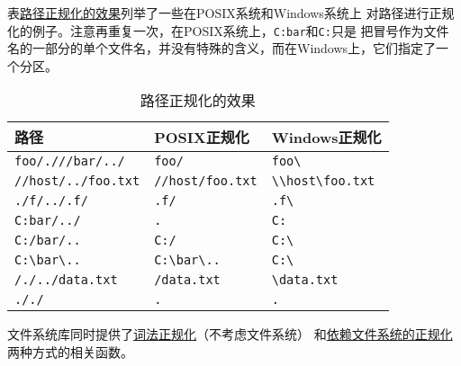 表\hyperref[t20.1]{路径正规化的效果}列举了一些在POSIX系统和Windows系统上
对路径进行正规化的例子。注意再重复一次，在POSIX系统上，\texttt{C:bar}和\texttt{C:}只是
把冒号作为文件名的一部分的单个文件名，并没有特殊的含义，而在Windows上，它们指定了一个分区。
\begin{table}[ht]
    \begin{tabular}{l|l|p{}}
        \hline
        \textbf{路径}                                    & \textbf{POSIX正规化}                              & \textbf{Windows正规化}                                               \\
        \hline
        \texttt{foo/.///bar/../}                       & \texttt{foo/}                                  & \texttt{foo\textbackslash}                                        \\
        \texttt{//host/../foo.txt}                     & \texttt{//host/foo.txt}                        & \texttt{\textbackslash \textbackslash host\textbackslash foo.txt} \\
        \texttt{./f/../.f/}                            & \texttt{.f/}                                   & \texttt{.f\textbackslash}                                         \\
        \texttt{C:bar/../}                             & \texttt{.}                                     & \texttt{C:}                                                       \\
        \texttt{C:/bar/..}                             & \texttt{C:/}                                   & \texttt{C:\textbackslash}                                         \\
        \texttt{C:\textbackslash bar\textbackslash ..} & \texttt{C:\textbackslash bar\textbackslash ..} & \texttt{C:\textbackslash}                                         \\
        \texttt{/./../data.txt}                        & \texttt{/data.txt}                             & \texttt{\textbackslash data.txt}                                  \\
        \texttt{././}                                  & \texttt{.}                                     & \texttt{.}                                                        \\
        \hline
    \end{tabular}
    \caption{路径正规化的效果}
    \label{t20.1}
\end{table}

文件系统库同时提供了\hyperref[ch20.3.3]{词法正规化}（不考虑文件系统）
和\hyperref[ch20.4.5]{依赖文件系统的正规化}两种方式的相关函数。

